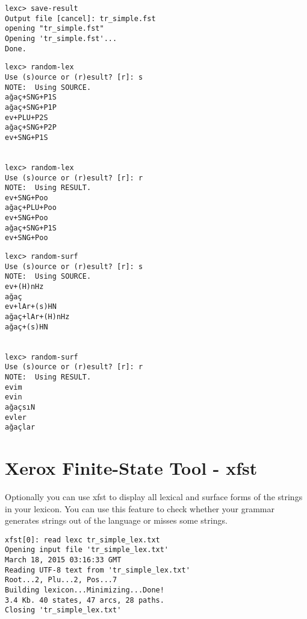 \documentclass[11pt,a4paper]{article}
\begin{document}
\newpage

\begin{lstlisting}[caption={Save your work so that you can use the transducer with lookup application}, belowskip=1em,frame=single]
lexc> save-result
Output file [cancel]: tr_simple.fst
opening "tr_simple.fst"
Opening 'tr_simple.fst'...
Done.
\end{lstlisting}

\begin{lstlisting}[title={Samples from lexical level}, belowskip=1em,frame=single]
lexc> random-lex
Use (s)ource or (r)esult? [r]: s
NOTE:  Using SOURCE.
ağaç+SNG+P1S
ağaç+SNG+P1P
ev+PLU+P2S
ağaç+SNG+P2P
ev+SNG+P1S


lexc> random-lex
Use (s)ource or (r)esult? [r]: r
NOTE:  Using RESULT.
ev+SNG+Poo
ağaç+PLU+Poo
ev+SNG+Poo
ağaç+SNG+P1S
ev+SNG+Poo
\end{lstlisting}

\begin{lstlisting}[title={Samples from surface level}, belowskip=1em,frame=single]
lexc> random-surf
Use (s)ource or (r)esult? [r]: s
NOTE:  Using SOURCE.
ev+(H)nHz
ağaç
ev+lAr+(s)HN
ağaç+lAr+(H)nHz
ağaç+(s)HN


lexc> random-surf
Use (s)ource or (r)esult? [r]: r
NOTE:  Using RESULT.
evim
evin
ağaçsıN
evler
ağaçlar
\end{lstlisting}

\setcounter{lstlisting}{0}


\newpage

\section{Xerox Finite-State Tool - xfst}
Optionally you can use xfst to display all lexical and surface forms of the strings in your lexicon. You can use this feature to check whether your grammar generates strings out of the language or misses some strings.\\

\begin{lstlisting}[caption={Read the lexicon file}, belowskip=1em,frame=single]
xfst[0]: read lexc tr_simple_lex.txt
Opening input file 'tr_simple_lex.txt'
March 18, 2015 03:16:33 GMT
Reading UTF-8 text from 'tr_simple_lex.txt' 
Root...2, Plu...2, Pos...7
Building lexicon...Minimizing...Done!
3.4 Kb. 40 states, 47 arcs, 28 paths.
Closing 'tr_simple_lex.txt'

\end{lstlisting}
\end{document}
